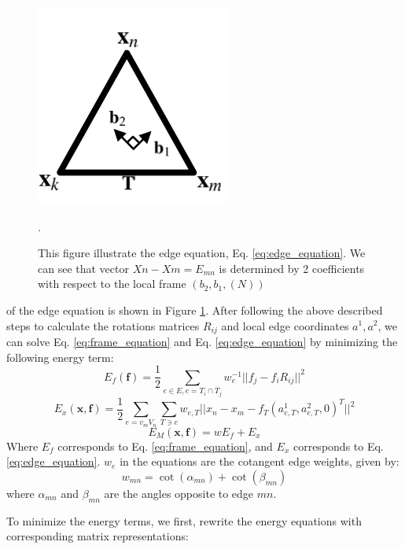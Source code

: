 \documentclass{6838publ}
\begin{document}
\begin{figure}[t!]  \centering
  \includegraphics[width=.6\linewidth]{edge_equation}
  \caption{ This figure illustrate the edge equation,
Eq. \ref{eq:edge_equation}.  We can see that vector $Xn - Xm = E_{mn}$
is determined by 2 coefficients with respect to the local frame
$(b_{2}, b_{1}, (N))$}.
  \label{fig:edge_equation}
\end{figure} of the edge equation is shown in Figure
\ref{fig:edge_equation}. After following the above described steps to
calculate the rotations matrices $R_{ij}$ and local edge coordinates
$a^{1}, a^{2}$, we can solve Eq. \ref{eq:frame_equation} and
Eq. \ref{eq:edge_equation} by minimizing the following energy term:
\begin{equation} \label{eq:frame_energy} E_f(\mathbf{f}) = \frac{1}{2}
\sum_{e \in E, e = T_i \cap T_j} w_e^{-1} || f_j - f_iR_{ij} ||^2
\end{equation}
\begin{equation} \label{eq:edge_energy} E_x(\mathbf{x}, \mathbf{f}) =
\frac{1}{2} \sum_{e=v_mV_n} \sum_{T \ni e} w_{e, T} ||x_n - x_m -
f_T(a^1_{e,T}, a^2_{e,T}, 0)^T ||^2
\end{equation}
\begin{equation} \label{eq:sum_energy} E_M(\mathbf{x}, \mathbf{f}) = w
E_f + E_x
\end{equation} Where $E_f$ corresponds to Eq. \ref{eq:frame_equation},
and $E_x$ corresponds to Eq. \ref{eq:edge_equation}. $w_{e}$ in the
equations are the cotangent edge weights, given by:
\[w_{mn} = \cot(\alpha_{mn}) + \cot(\beta_{mn})
\] where $\alpha_{mn}$ and $\beta_{mn}$ are the angles opposite to
edge $mn$.
\par To minimize the energy terms, we first, rewrite the energy
equations with corresponding matrix representations:
\end{document}
